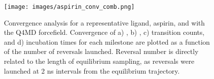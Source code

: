\begin{figure}
	\texttt{[image: images/aspirin\_conv\_comb.png]}

	\caption{Convergence analysis for a representative ligand,  aspirin, and \bcd with the Q4MD forcefield. Convergence of a) \kon, b) \koff,  c) transition counts, and d) incubation times for each milestone are plotted as a function of the number of reversals launched.  Reversal number is directly related to the length of equilibrium sampling, as reversals were launched at 2 ns intervals from the equilibrium trajectory.}
	\label{fig:aspirin_conv_fig}
\end{figure}